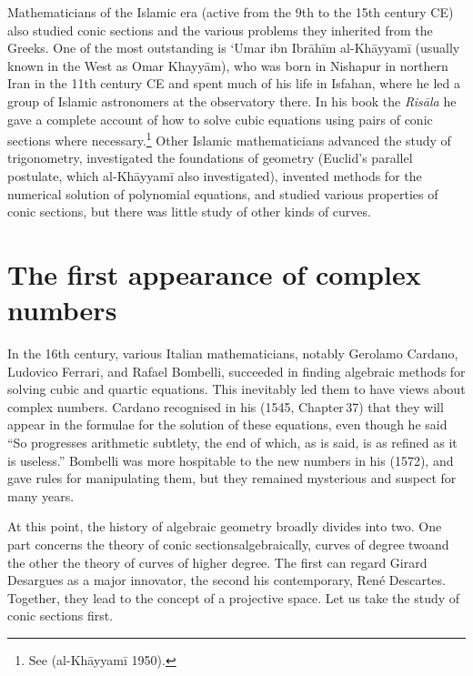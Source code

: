 Mathematicians of the Islamic era  (active from the 9th to the 15th
century CE)
also studied conic sections and the various problems they inherited from the Greeks. One of the most outstanding is `Umar ibn Ibr\={a}h\={i}m al-Kh\={a}yyam\={i} (usually known in the West as Omar Khayy\={a}m), who was born in Nishapur in northern Iran  in the 11th century CE and spent much of his life in Isfahan, where he led a group of Islamic astronomers at the observatory there. In his book the \emph{Ris\={a}la} he 
 gave a complete account of how to solve cubic equations using pairs of conic sections where necessary.\footnote{See (al-Kh\={a}yyam\={i} 1950).} Other Islamic mathematicians advanced the study of trigonometry, investigated the foundations of geometry (Euclid's parallel postulate, which al-Kh\={a}yyam\={i} also investigated), invented methods for the numerical solution of polynomial equations, and studied various properties of conic sections, but there was little study of other kinds of curves. 
 
\section{The first appearance of complex numbers} 
In the 16th century, various Italian mathematicians, notably Gerolamo Cardano, Ludovico Ferrari,  and Rafael Bombelli, succeeded in finding algebraic methods for solving cubic and quartic equations. This inevitably led them to have views about complex numbers. Cardano recognised in his  (1545, Chapter\,37) that they will appear in the formulae for the solution of these equations, even though he said ``So progresses arithmetic subtlety, the end of which, as is said, is as refined as it is useless.'' Bombelli was more hospitable to the new numbers in his  (1572), and gave rules for manipulating them, but they remained mysterious and suspect for many years.



At this point, the history of algebraic geometry broadly divides into two. One part concerns the theory of conic sections\emdash algebraically, curves of degree two\emdash and the other the theory of curves of higher degree. The first can regard Girard Desargues as a major innovator, the second his contemporary,  Ren\'e Descartes. Together, they lead to the concept of a projective space. Let us take the study of conic sections first. 



